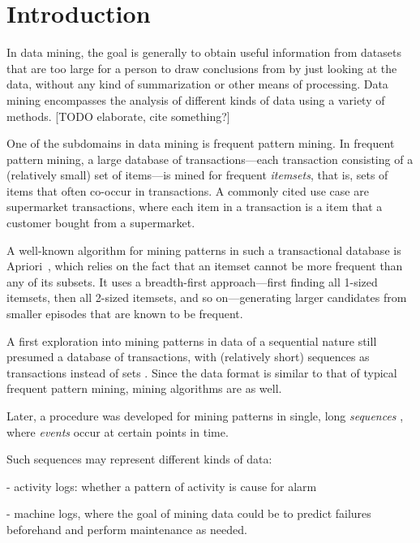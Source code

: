 \chapter{Introduction}

In data mining, the goal is generally to obtain useful information from datasets that are too large for a person to draw conclusions from by just looking at the data, without any kind of summarization or other means of processing. Data mining encompasses the analysis of different kinds of data using a variety of methods. [TODO elaborate, cite something?]

One of the subdomains in data mining is frequent pattern mining. In frequent pattern mining, a large database of transactions---each transaction consisting of a (relatively small) set of items---is mined for frequent \emph{itemsets}, that is, sets of items that often co-occur in transactions. A commonly cited use case are supermarket transactions, where each item in a transaction is a item that a customer bought from a supermarket.

A well-known algorithm for mining patterns in such a transactional database is Apriori~\citep{agrawal1994fast}, which relies on the fact that an itemset cannot be more frequent than any of its subsets. It uses a breadth-first approach---first finding all 1-sized itemsets, then all 2-sized itemsets, and so on---generating larger candidates from smaller episodes that are known to be frequent.


A first exploration into mining patterns in data of a sequential nature still presumed a database of transactions, with (relatively short) sequences as transactions instead of sets \citep{agrawal1995mining}.
Since the data format is similar to that of typical frequent pattern mining, mining algorithms are as well. %


Later, a procedure was developed for mining patterns in single, long \emph{sequences} \citep{mannila1997discovery}, where \emph{events} occur at certain points in time.

Such sequences may represent different kinds of data:

- activity logs: whether a pattern of activity is cause for alarm

- machine logs, where the goal of mining data could be to predict failures beforehand and perform maintenance as needed.

